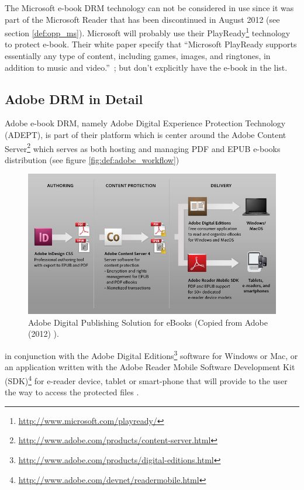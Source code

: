 \documentclass[11pt,a4paper,oneside]{memoir}
\begin{document}
The Microsoft e-book DRM technology can not be considered in use since it was part of the Microsoft Reader that has been discontinued in August 2012 (see section \vref{def:opp_ms}). Microsoft will probably use their PlayReady\footnote{\url{http://www.microsoft.com/playready/}} technology to protect e-book. Their white paper specify that \textquotedblleft Microsoft PlayReady supports essentially any type of content, including games, images, and ringtones, in addition to music and video.\textquotedblright ~\cite[p. 4]{ms:playready}; but don't explicitly have the e-book in the list. 

\subsection{Adobe DRM in Detail}\label{def:adobe_drm}

Adobe e-book DRM, namely Adobe Digital Experience Protection Technology (ADEPT), is part of their platform which is center around the Adobe Content Server\footnote{\url{http://www.adobe.com/products/content-server.html}} which serves as both hosting and managing PDF and EPUB e-books distribution (see figure \vref{fig:def:adobe_workflow})
\begin{figure}[h]
   \centering
   	\includegraphics[width=14.7cm]{adobe_ebook_workflow}
   \caption{Adobe Digital Publishing Solution for eBooks (Copied from Adobe (2012) \cite{adobe:digital_publishing}).}
   \label{fig:def:adobe_workflow}
\end{figure}
in conjunction with the Adobe Digital Editions\footnote{\url{http://www.adobe.com/products/digital-editions.html}} software for Windows or Mac, or an application written with the Adobe Reader Mobile Software Development Kit (SDK)\footnote{\url{http://www.adobe.com/devnet/readermobile.html}} for e-reader device, tablet or smart-phone that will provide to the user the way to access the protected files \cite{adobe:whitepaper}.
\end{document}
